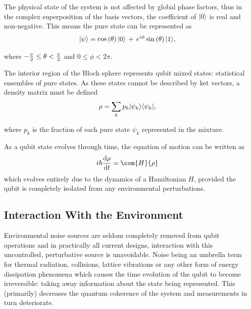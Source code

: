 The physical state of the system is not affected by global phase factors, thus in the complex superposition of the basis vectors, the coefficient of $\lvert0\rangle$ is real and non-negative.
This means the pure state can be represented as
\begin{equation}
\lvert\psi\rangle = \cos\left(\theta\right) \lvert0\rangle \, + \, e^{i \phi}  \sin\left(\theta\right) \lvert1\rangle,
\label{eq:purestate}
\end{equation}

where $\cramped{-\frac{\pi}{2} \leq \theta < \frac{\pi}{2}}$ and $0 \leq \phi < 2 \pi$.

The interior region of the Bloch sphere represents qubit mixed states: statistical ensembles of pure states.
As these states cannot be described by ket vectors, a density matrix must be defined
\begin{equation}
\rho = \sum_k p_k \lvert\psi_k\rangle \langle\psi_k\rvert,
\end{equation}

where $p_k$ is the fraction of each pure state $\psi_k$ represented in the mixture.

As a qubit state evolves through time, the equation of motion can be written as
\begin{equation}
i\hbar \frac{\mathrm{d}\rho}{\mathrm{d}t} = \com{H}{\rho}
\label{eq:tevqubit}
\end{equation}
which evolves entirely due to the dynamics of a Hamiltonian $H$,
provided the qubit is completely isolated from any environmental perturbations.

\subsection{Interaction With the Environment}\label{sec:envint}

Environmental noise sources are seldom completely removed from qubit operations and in practically all current designs, interaction with this uncontrolled, perturbative source is unavoidable.
Noise being an umbrella term for thermal radiation, collisions, lattice vibrations or any other form of energy dissipation phenomena which causes the time evolution of the qubit to become irreversible: taking away information about the state being represented.
This (primarily) decreases the quantum coherence of the system and measurements in turn deteriorate.

